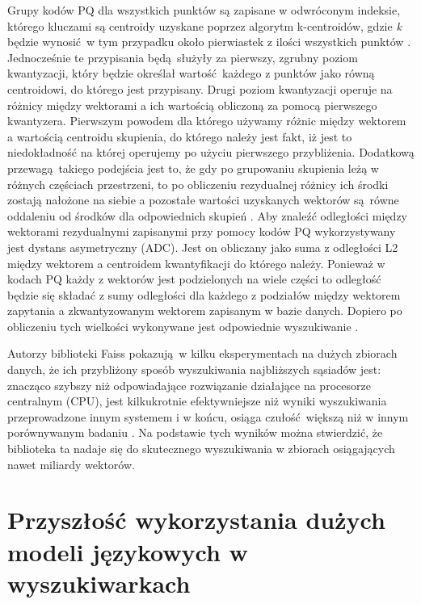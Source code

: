 Grupy kodów PQ dla wszystkich punktów są zapisane w odwróconym indeksie, którego kluczami są centroidy uzyskane poprzez algorytm k-centroidów, gdzie \emph{k} będzie wynosić w tym przypadku około pierwiastek z ilości wszystkich punktów \autocite{raffel2020exploring}. Jednocześnie te przypisania będą służyły za pierwszy, zgrubny poziom kwantyzacji, który będzie określał wartość każdego z punktów jako równą centroidowi, do którego jest przypisany. Drugi poziom kwantyzacji operuje na różnicy między wektorami a ich wartością obliczoną za pomocą pierwszego kwantyzera. Pierwszym powodem dla którego używamy różnic między wektorem a wartością centroidu skupienia, do którego należy jest fakt, iż jest to niedokładność na której operujemy po użyciu pierwszego przybliżenia. Dodatkową przewagą takiego podejścia jest to, że gdy po grupowaniu skupienia leżą w różnych częściach przestrzeni, to po obliczeniu rezydualnej różnicy ich środki zostają nałożone na siebie a pozostałe wartości uzyskanych wektorów są równe oddaleniu od środków dla odpowiednich skupień \autocite{similaritysearch}. Aby znaleźć odległości między wektorami rezydualnymi zapisanymi przy pomocy kodów PQ wykorzystywany jest dystans asymetryczny (ADC). Jest on obliczany jako suma z odległości L2 między wektorem a centroidem kwantyfikacji do którego należy. Ponieważ w kodach PQ każdy z wektorów jest podzielonych na wiele części to odległość będzie się składać z sumy odległości dla każdego z podziałów między wektorem zapytania a zkwantyzowanym wektorem zapisanym w bazie danych. Dopiero po obliczeniu tych wielkości wykonywane jest odpowiednie wyszukiwanie \autocite{similaritysearch} \autocite{productquantaization}.\newline

Autorzy biblioteki Faiss pokazują w kilku eksperymentach na dużych zbiorach danych, że ich przybliżony sposób wyszukiwania najbliższych sąsiadów jest: znacząco szybszy niż odpowiadające rozwiązanie działające na procesorze centralnym (CPU), jest kilkukrotnie efektywniejsze niż wyniki wyszukiwania przeprowadzone innym systemem i w końcu, osiąga czułość większą niż w innym porównywanym badaniu \autocite{raffel2020exploring}. Na podstawie tych wyników można stwierdzić, że biblioteka ta nadaje się do skutecznego wyszukiwania w zbiorach osiągających nawet miliardy wektorów.

\section{Przyszłość wykorzystania dużych modeli językowych w wyszukiwarkach}

